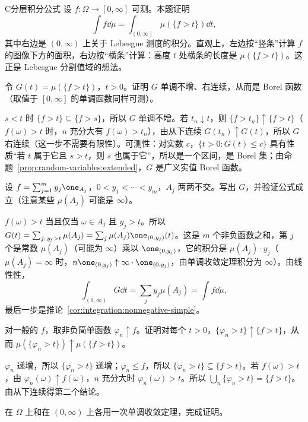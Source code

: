 \begin{probleme}{C}{分层积分公式}
设 $f:\Omega\to[0,\infty]$ 可测。本题证明
\[
\int f\dd\mu=\int_{(0,\infty)}\mu(\{f>t\})\dd t,
\]
其中右边是 $(0,\infty)$ 上关于 Lebesgue 测度的积分。直观上，左边按“竖条”计算 $f$ 的图像下方的面积，右边按“横条”计算：高度 $t$ 处横条的长度是 $\mu(\{f>t\})$。这正是 Lebesgue 分割值域的想法。
\begin{questions}
\item 令 $G(t)=\mu(\{f>t\})$，$t>0$。证明 $G$ 单调不增、右连续，从而是 Borel 函数（取值于 $[0,\infty]$ 的单调函数同样可测）。
\begin{solution}
$s<t$ 时 $\{f>t\}\subseteq\{f>s\}$，所以 $G$ 单调不增。若 $t_n\downarrow t$，则 $\{f>t_n\}\uparrow\{f>t\}$（$f(\omega)>t$ 时，$n$ 充分大有 $f(\omega)>t_n$），由从下连续 $G(t_n)\uparrow G(t)$，所以 $G$ 右连续（这一步不需要有限性）。可测性：对实数 $c$，$\{t>0:G(t)\leqslant c\}$ 具有性质“若 $t$ 属于它且 $s>t$，则 $s$ 也属于它”，所以是一个区间，是 Borel 集；由命题~\ref{prop:random-variables:extended}，$G$ 是广义实值 Borel 函数。
\end{solution}
\item 设 $f=\sum_{j=1}^my_j\one_{A_j}$，$0<y_1<\cdots<y_m$，$A_j$ 两两不交。写出 $G$，并验证公式成立（注意某些 $\mu(A_j)$ 可能是 $\infty$）。
\begin{solution}
$f(\omega)>t$ 当且仅当 $\omega\in A_j$ 且 $y_j>t$。所以 $G(t)=\sum_{j:\,y_j>t}\mu(A_j)=\sum_j\mu(A_j)\one_{(0,y_j)}(t)$。这是 $m$ 个非负函数之和，第 $j$ 个是常数 $\mu(A_j)$（可能为 $\infty$）乘以 $\one_{(0,y_j)}$，它的积分是 $\mu(A_j)\cdot y_j$（$\mu(A_j)=\infty$ 时，$n\one_{(0,y_j)}\uparrow\infty\cdot\one_{(0,y_j)}$，由单调收敛定理积分为 $\infty$）。由线性性，
\[
\int_{(0,\infty)}G\dd t=\sum_jy_j\mu(A_j)=\int f\dd\mu,
\]
最后一步是推论~\ref{cor:integration:nonnegative-simple}。
\end{solution}
\item 对一般的 $f$，取非负简单函数 $\varphi_n\uparrow f$。证明对每个 $t>0$，$\{\varphi_n>t\}\uparrow\{f>t\}$，从而 $\mu(\{\varphi_n>t\})\uparrow\mu(\{f>t\})$。
\begin{solution}
$\varphi_n$ 递增，所以 $\{\varphi_n>t\}$ 递增；$\varphi_n\leqslant f$，所以 $\{\varphi_n>t\}\subseteq\{f>t\}$。若 $f(\omega)>t$，由 $\varphi_n(\omega)\uparrow f(\omega)$，$n$ 充分大时 $\varphi_n(\omega)>t$。所以 $\bigcup_n\{\varphi_n>t\}=\{f>t\}$。由从下连续得第二个结论。
\end{solution}
\item 在 $\Omega$ 上和在 $(0,\infty)$ 上各用一次单调收敛定理，完成证明。

\end{questions}
\end{probleme}
